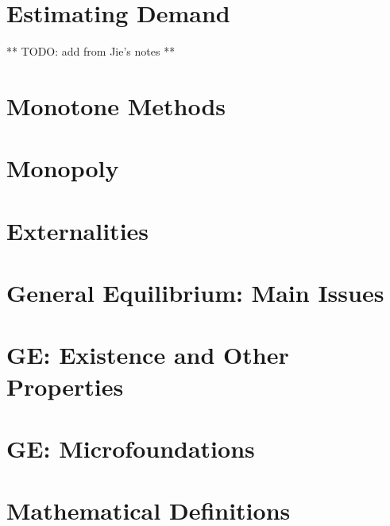 \documentclass{article}
\begin{document}



\newpage

\section{Estimating Demand}
\label{sec:estimating-demand}

** TODO: add from Jie's notes **

\section{Monotone Methods}
\label{sec:monotone-methods}



\section{Monopoly}
\label{sec:monopoly}



\section{Externalities}
\label{sec:externalities}



\section{General Equilibrium: Main Issues}
\label{sec:main-issues}



\section{GE: Existence and Other Properties}
\label{sec:exist-other-prop}



\section{GE: Microfoundations}
\label{sec:microfoundations}



\newpage
\appendix
\section{Mathematical Definitions}
\label{sec:math-defin}
\end{document}
